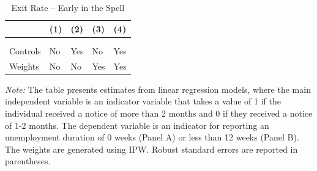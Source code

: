 \documentclass{div}
\newcommand{\outdir}{./../output}
\begin{document}
\begin{table}[t]
\begin{threeparttable}
\caption{Exit Rate -- Early in the Spell}\label{tab_init_hazard}
\begin{tabularx}{\textwidth}{p{}YYYY}
\toprule
& (1) & (2) & (3) & (4) \\
\midrule \addlinespace[1ex]
 \\ \addlinespace[2ex]
 \addlinespace[3ex]
 \\ \addlinespace[2ex]
 \addlinespace[2ex]
Controls   &  No & Yes  & No & Yes \\
Weights   & No  & No   & Yes & Yes \\
\midrule

\bottomrule
\end{tabularx}
\begin{tablenotes}
\item \textit{Note:} The table presents estimates from linear regression models, where the main independent variable is an indicator variable that takes a value of 1 if the individual received a notice of more than 2 months and 0 if they received a notice of 1-2 months. The dependent variable is an indicator for reporting an unemployment duration of 0 weeks (Panel A) or less than 12 weeks (Panel B). The weights are generated using IPW. Robust standard errors are reported in parentheses. 
\end{tablenotes}
\end{threeparttable}
\end{table}


\end{document}
